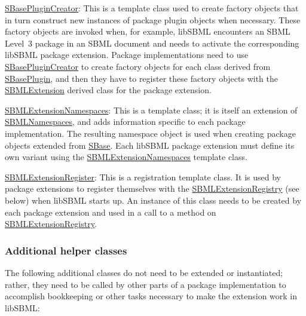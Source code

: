 \begin{DoxyItemize}
\item \hyperlink{class_s_base_plugin_creator}{S\+Base\+Plugin\+Creator}\+: This is a template class used to create factory objects that in turn construct new instances of package plugin objects when necessary. These factory objects are invoked when, for example, lib\+S\+B\+ML encounters an S\+B\+ML Level~3 package in an S\+B\+ML document and needs to activate the corresponding lib\+S\+B\+ML package extension. Package implementations need to use \hyperlink{class_s_base_plugin_creator}{S\+Base\+Plugin\+Creator} to create factory objects for each class derived from \hyperlink{class_s_base_plugin}{S\+Base\+Plugin}, and then they have to register these factory objects with the \hyperlink{class_s_b_m_l_extension}{S\+B\+M\+L\+Extension} derived class for the package extension.\end{DoxyItemize}
\begin{DoxyItemize}
\item \hyperlink{class_s_b_m_l_extension_namespaces}{S\+B\+M\+L\+Extension\+Namespaces}\+: This is a template class; it is itself an extension of \hyperlink{class_s_b_m_l_namespaces}{S\+B\+M\+L\+Namespaces}, and adds information specific to each package implementation. The resulting namespace object is used when creating package objects extended from \hyperlink{class_s_base}{S\+Base}. Each lib\+S\+B\+ML package extension must define its own variant using the \hyperlink{class_s_b_m_l_extension_namespaces}{S\+B\+M\+L\+Extension\+Namespaces} template class.\end{DoxyItemize}
\begin{DoxyItemize}
\item \hyperlink{class_s_b_m_l_extension_register}{S\+B\+M\+L\+Extension\+Register}\+: This is a registration template class. It is used by package extensions to register themselves with the \hyperlink{class_s_b_m_l_extension_registry}{S\+B\+M\+L\+Extension\+Registry} (see below) when lib\+S\+B\+ML starts up. An instance of this class needs to be created by each package extension and used in a call to a method on \hyperlink{class_s_b_m_l_extension_registry}{S\+B\+M\+L\+Extension\+Registry}.\end{DoxyItemize}
\hypertarget{classdoc__summary__of__extension__classes_ext-additional-helpers}{}\subsubsection{Additional helper classes}\label{classdoc__summary__of__extension__classes_ext-additional-helpers}
The following additional classes do not need to be extended or instantiated; rather, they need to be called by other parts of a package implementation to accomplish bookkeeping or other tasks necessary to make the extension work in lib\+S\+B\+ML\+:


